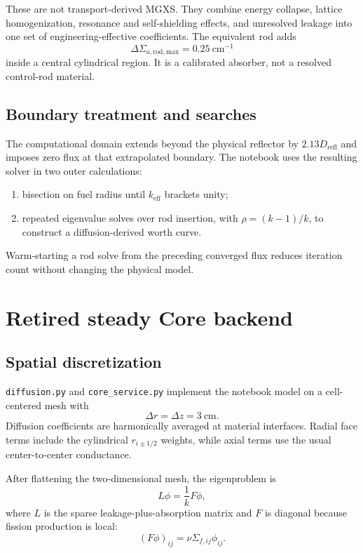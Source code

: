 \documentclass[11pt]{article}
\begin{document}
These are not transport-derived MGXS.  They combine energy collapse, lattice
homogenization, resonance and self-shielding effects, and unresolved leakage
into one set of engineering-effective coefficients.  The equivalent rod adds
\[
\Delta\Sigma_{a,\mathrm{rod,max}}=0.25\ \mathrm{cm}^{-1}
\]
inside a central cylindrical region.  It is a calibrated absorber, not a
resolved control-rod material.

\subsection{Boundary treatment and searches}

The computational domain extends beyond the physical reflector by
$2.13D_{\mathrm{refl}}$ and imposes zero flux at that extrapolated boundary.
The notebook uses the resulting solver in two outer calculations:
\begin{enumerate}
  \item bisection on fuel radius until $k_{\mathrm{eff}}$ brackets unity;
  \item repeated eigenvalue solves over rod insertion, with
        $\rho=(k-1)/k$, to construct a diffusion-derived worth curve.
\end{enumerate}

Warm-starting a rod solve from the preceding converged flux reduces iteration
count without changing the physical model.

\section{Retired steady Core backend}

\subsection{Spatial discretization}

\texttt{diffusion.py} and \texttt{core\_service.py} implement the notebook
model on a cell-centered mesh with
\[
\Delta r=\Delta z=3\ \mathrm{cm}.
\]
Diffusion coefficients are harmonically averaged at material interfaces.
Radial face terms include the cylindrical $r_{i\pm1/2}$ weights, while axial
terms use the usual center-to-center conductance.

After flattening the two-dimensional mesh, the eigenproblem is
\[
L\phi=\frac{1}{k}F\phi,
\]
where $L$ is the sparse leakage-plus-absorption matrix and $F$ is diagonal
because fission production is local:
\[
(F\phi)_{ij}=\nu\Sigma_{f,ij}\phi_{ij}.
\]
\end{document}
